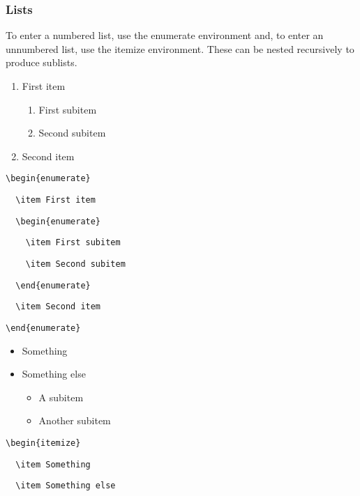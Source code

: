 \subsubsection{Lists}

To enter a numbered list, use the enumerate environment and, to enter an unnumbered list, use the itemize environment.  These can be nested recursively to produce sublists.

\begin{enumerate}
  \item First item
  \begin{enumerate}
    \item First subitem
    \item Second subitem
  \end{enumerate}
  \item Second item
\end{enumerate}

\verb=\begin{enumerate}=

\verb=  \item First item=

\verb=  \begin{enumerate}=

\verb=    \item First subitem=

\verb=    \item Second subitem=

\verb=  \end{enumerate}=

\verb=  \item Second item=

\verb=\end{enumerate}=

\begin{itemize}
  \item Something
  \item Something else
  \begin{itemize}
    \item A subitem
    \item Another subitem
  \end{itemize}
\end{itemize}

\verb=\begin{itemize}=

\verb=  \item Something=

\verb=  \item Something else=


